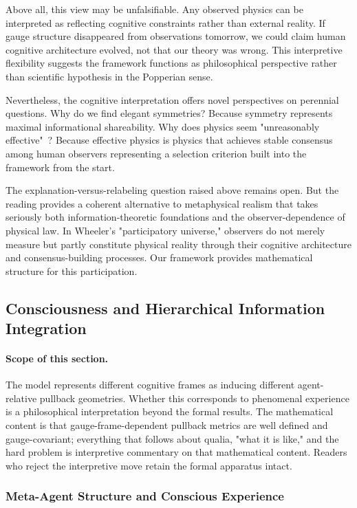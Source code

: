 \documentclass[11pt]{article}
\begin{document}
Above all, this view may be unfalsifiable. Any observed physics can be interpreted as reflecting cognitive constraints rather than external reality. If gauge structure disappeared from observations tomorrow, we could claim human cognitive architecture evolved, not that our theory was wrong. This interpretive flexibility suggests the framework functions as philosophical perspective rather than scientific hypothesis in the Popperian sense.

Nevertheless, the cognitive interpretation offers novel perspectives on perennial questions. Why do we find elegant symmetries? Because symmetry represents maximal informational shareability. Why does physics seem "unreasonably effective"~\cite{Wigner1960}? Because effective physics is physics that achieves stable consensus among human observers representing a selection criterion built into the framework from the start.

The explanation-versus-relabeling question raised above remains open. But the reading provides a coherent alternative to metaphysical realism that takes seriously both information-theoretic foundations and the observer-dependence of physical law. In Wheeler's "participatory universe," observers do not merely measure but partly constitute physical reality through their cognitive architecture and consensus-building processes. Our framework provides mathematical structure for this participation.

\subsection{Consciousness and Hierarchical Information Integration}
\label{sec:consciousness_section}

\paragraph{Scope of this section.}
The model represents different cognitive frames as inducing different agent-relative pullback geometries. Whether this corresponds to phenomenal experience is a philosophical interpretation beyond the formal results. The mathematical content is that gauge-frame-dependent pullback metrics are well defined and gauge-covariant; everything that follows about qualia, "what it is like," and the hard problem is interpretive commentary on that mathematical content. Readers who reject the interpretive move retain the formal apparatus intact.

\subsubsection{Meta-Agent Structure and Conscious Experience}
\end{document}
